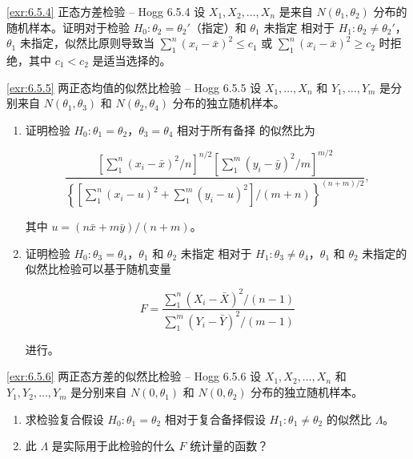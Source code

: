 \begin{exercise}{\ref{exr:6.5.4} 正态方差检验 – Hogg 6.5.4}\label{exr:6.5.4}
设 $X_1, X_2, \ldots, X_n$ 是来自 $N(\theta_1,\theta_2)$ 分布的随机样本。证明对于检验 $H_0: \theta_2 = \theta_2'$（指定）和 $\theta_1$ 未指定 相对于 $H_1: \theta_2 \neq \theta_2'$，$\theta_1$ 未指定，似然比原则导致当 $\sum_{1}^n(x_i-\bar{x})^2 \leq c_1$ 或 $\sum_{1}^n(x_i-\bar{x})^2 \geq c_2$ 时拒绝，其中 $c_1 < c_2$ 是适当选择的。
\end{exercise}

\begin{exercise}{\ref{exr:6.5.5} 两正态均值的似然比检验 – Hogg 6.5.5}\label{exr:6.5.5}
设 $X_1,\ldots,X_n$ 和 $Y_1,\ldots,Y_m$ 是分别来自 $N(\theta_1,\theta_3)$ 和 $N(\theta_2,\theta_4)$ 分布的独立随机样本。

\begin{enumerate}
\item[(a)] 证明检验 $H_0: \theta_1 = \theta_2$，$\theta_3 = \theta_4$ 相对于所有备择 的似然比为

\[
\frac{\left[ \sum_1^n (x_i-\bar{x})^2/n \right]^{n/2} \left[ \sum_1^m (y_i-\bar{y})^2/m \right]^{m/2}}{\left\{\left[ \sum_1^n (x_i-u)^2 + \sum_1^m (y_i-u)^2 \right] / (m+n) \right\}^{(n+m)/2}},
\]

其中 $u = (n\bar{x}+m\bar{y})/(n+m)$。

\item[(b)] 证明检验 $H_0: \theta_3 = \theta_4$，$\theta_1$ 和 $\theta_2$ 未指定 相对于 $H_1: \theta_3 \neq \theta_4$，$\theta_1$ 和 $\theta_2$ 未指定的似然比检验可以基于随机变量

\[
F = \frac{\sum_1^n (X_i-\bar{X})^2/(n-1)}{\sum_1^m (Y_i-\bar{Y})^2/(m-1)}
\]

进行。
\end{enumerate}
\end{exercise}

\begin{exercise}{\ref{exr:6.5.6} 两正态方差的似然比检验 – Hogg 6.5.6}\label{exr:6.5.6}
设 $X_1, X_2, \ldots, X_n$ 和 $Y_1, Y_2, \ldots, Y_m$ 是分别来自 $N(0,\theta_1)$ 和 $N(0,\theta_2)$ 分布的独立随机样本。

\begin{enumerate}
\item[(a)] 求检验复合假设 $H_0: \theta_1 = \theta_2$ 相对于复合备择假设 $H_1: \theta_1 \neq \theta_2$ 的似然比 $\Lambda$。
\item[(b)] 此 $\Lambda$ 是实际用于此检验的什么 $F$ 统计量的函数？
\end{enumerate}
\end{exercise}

